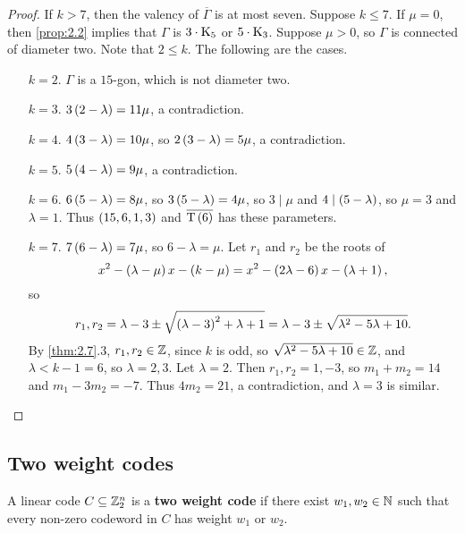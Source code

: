 \begin{proof}
If $ k > 7 $, then the valency of $ \overline{\Gamma} $ is at most seven. Suppose $ k \le 7 $. If $ \mu = 0 $, then \ref{prop:2.2} implies that $ \Gamma $ is $ 3 \cdot \mathrm{K}_5 $ or $ 5 \cdot \mathrm{K}_3 $. Suppose $ \mu > 0 $, so $ \Gamma $ is connected of diameter two. Note that $ 2 \le k $. The following are the cases.
\begin{enumerate}[leftmargin=0.5in]
\item[$ k = 2 $.] $ \Gamma $ is a $ 15 $-gon, which is not diameter two.
\item[$ k = 3 $.] $ 3\br{2 - \lambda} = 11\mu $, a contradiction.
\item[$ k = 4 $.] $ 4\br{3 - \lambda} = 10\mu $, so $ 2\br{3 - \lambda} = 5\mu $, a contradiction.
\item[$ k = 5 $.] $ 5\br{4 - \lambda} = 9\mu $, a contradiction.
\item[$ k = 6 $.] $ 6\br{5 - \lambda} = 8\mu $, so $ 3\br{5 - \lambda} = 4\mu $, so $ 3 \mid \mu $ and $ 4 \mid \br{5 - \lambda} $, so $ \mu = 3 $ and $ \lambda = 1 $. Thus $ \br{15, 6, 1, 3} $ and $ \overline{\T\br{6}} $ has these parameters.
\item[$ k = 7 $.] $ 7\br{6 - \lambda} = 7\mu $, so $ 6 - \lambda = \mu $. Let $ r_1 $ and $ r_2 $ be the roots of
$$ x^2 - \br{\lambda - \mu}x - \br{k - \mu} = x^2 - \br{2\lambda - 6}x - \br{\lambda + 1}, $$
so
$$ r_1, r_2 = \lambda - 3 \pm \sqrt{\br{\lambda - 3}^2 + \lambda + 1} = \lambda - 3 \pm \sqrt{\lambda^2 - 5\lambda + 10}. $$
By \ref{thm:2.7}.$ 3 $, $ r_1, r_2 \in \mathbb{Z} $, since $ k $ is odd, so $ \sqrt{\lambda^2 - 5\lambda + 10} \in \mathbb{Z} $, and $ \lambda < k - 1 = 6 $, so $ \lambda = 2, 3 $. Let $ \lambda = 2 $. Then $ r_1, r_2 = 1, -3 $, so $ m_1 + m_2 = 14 $ and $ m_1 - 3m_2 = -7 $. Thus $ 4m_2 = 21 $, a contradiction, and $ \lambda = 3 $ is similar.
\end{enumerate}
\end{proof}

\subsection{Two weight codes}


\begin{definition*}
A linear code $ C \subseteq \mathbb{Z}_2^n $ is a \textbf{two weight code} if there exist $ w_1, w_2 \in \mathbb{N} $ such that every non-zero codeword in $ C $ has weight $ w_1 $ or $ w_2 $.
\end{definition*}

